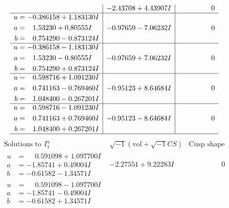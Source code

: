 \documentclass[1p]{elsarticle_modified}
\theoremstyle{definition}
\newcommand{\I}{\sqrt{-1}}
\begin{document}
$$\begin{array}{c|c|c}
 & -2.43708 + 4.43907 I & \phantom{-0.000000 } 0 \\ \hline\begin{aligned}
u &= -0.386158 + 1.183130 I \\
a &= \phantom{-}1.53230 + 0.80555 I \\
b &= \phantom{-}0.754290 - 0.873124 I\end{aligned}
 & -0.97659 - 7.06232 I & \phantom{-0.000000 } 0 \\ \hline\begin{aligned}
u &= -0.386158 - 1.183130 I \\
a &= \phantom{-}1.53230 - 0.80555 I \\
b &= \phantom{-}0.754290 + 0.873124 I\end{aligned}
 & -0.97659 + 7.06232 I & \phantom{-0.000000 } 0 \\ \hline\begin{aligned}
u &= \phantom{-}0.598716 + 1.091230 I \\
a &= \phantom{-}0.741163 - 0.769460 I \\
b &= \phantom{-}1.048400 - 0.267201 I\end{aligned}
 & -0.95123 + 8.64684 I & \phantom{-0.000000 } 0 \\ \hline\begin{aligned}
u &= \phantom{-}0.598716 - 1.091230 I \\
a &= \phantom{-}0.741163 + 0.769460 I \\
b &= \phantom{-}1.048400 + 0.267201 I\end{aligned}
 & -0.95123 - 8.64684 I & \phantom{-0.000000 } 0\\
 \hline 
 \end{array}$$\newpage$$\begin{array}{c|c|c}  
\text{Solutions to }I^u_{1}& \I (\text{vol} + \sqrt{-1}CS) & \text{Cusp shape}\\
 \hline 
\begin{aligned}
u &= \phantom{-}0.591098 + 1.097700 I \\
a &= -1.85741 + 0.49004 I \\
b &= -0.61582 - 1.34571 I\end{aligned}
 & -2.27551 + 9.22283 I & \phantom{-0.000000 } 0 \\ \hline\begin{aligned}
u &= \phantom{-}0.591098 - 1.097700 I \\
a &= -1.85741 - 0.49004 I \\
b &= -0.61582 + 1.34571 I\end{aligned}

\end{array}$$
\end{document}
